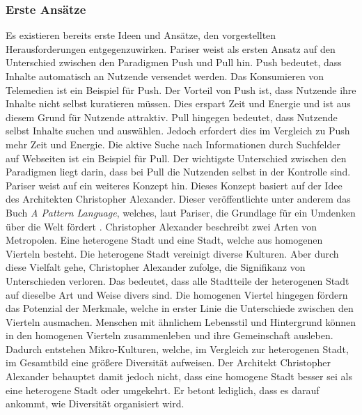 \subsubsection{Erste Ansätze}\label{subsec:first-solutions}
Es existieren bereits erste Ideen und Ansätze, den vorgestellten Herausforderungen entgegenzuwirken.
Pariser weist als ersten Ansatz auf den Unterschied zwischen den Paradigmen Push und Pull hin.
Push bedeutet, dass Inhalte automatisch an Nutzende versendet werden.
Das Konsumieren von Telemedien ist ein Beispiel für Push.
Der Vorteil von Push ist, dass Nutzende ihre Inhalte nicht selbst kuratieren müssen.
Dies erspart Zeit und Energie und ist aus diesem Grund für Nutzende attraktiv.
Pull hingegen bedeutet, dass Nutzende selbst Inhalte suchen und auswählen.
Jedoch erfordert dies im Vergleich zu Push mehr Zeit und Energie.
Die aktive Suche nach Informationen durch Suchfelder auf Webseiten ist ein Beispiel für Pull.
Der wichtigste Unterschied zwischen den Paradigmen liegt darin, dass bei Pull die Nutzenden selbst in der Kontrolle sind.\\

Pariser weist auf ein weiteres Konzept hin.
Dieses Konzept basiert auf der Idee des Architekten Christopher Alexander.
Dieser veröffentlichte unter anderem das Buch \textit{A Pattern Language}, welches, laut Pariser, die Grundlage für ein Umdenken über die Welt fördert \cite{a-pattern-language}.
Christopher Alexander beschreibt zwei Arten von Metropolen.
Eine heterogene Stadt und eine Stadt, welche aus homogenen Vierteln besteht.
Die heterogene Stadt vereinigt diverse Kulturen.
Aber durch diese Vielfalt gehe, Christopher Alexander zufolge, die Signifikanz von Unterschieden verloren.
Das bedeutet, dass alle Stadtteile der heterogenen Stadt auf dieselbe Art und Weise divers sind.
Die homogenen Viertel hingegen fördern das Potenzial der Merkmale, welche in erster Linie die Unterschiede zwischen den Vierteln ausmachen.
Menschen mit ähnlichem Lebensstil und Hintergrund können in den homogenen Vierteln zusammenleben und ihre Gemeinschaft ausleben.
Dadurch entstehen Mikro-Kulturen, welche, im Vergleich zur heterogenen Stadt, im Gesamtbild eine größere Diversität aufweisen.
Der Architekt Christopher Alexander behauptet damit jedoch nicht, dass eine homogene Stadt besser sei als eine heterogene Stadt oder umgekehrt.
Er betont lediglich, dass es darauf ankommt, wie Diversität organisiert wird.\\


